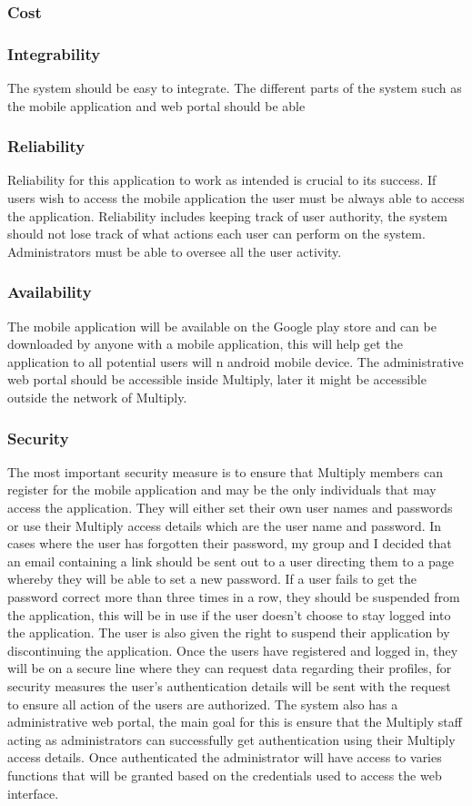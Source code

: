 \documentclass[11pt]{article}
\begin{document}
\subsubsection{Cost}

\subsubsection{Integrability}
The system should be easy to integrate. The different parts of the system such as the mobile application and web portal should be able   
\subsubsection{Reliability}
Reliability for this application to work as intended is crucial to its success. If users wish to access the mobile application the user must be always able to access the application. Reliability includes keeping track of user authority, the system should not lose track of what actions each user can perform on the system. Administrators must be able to oversee all the user activity.
\subsubsection{Availability}
The mobile application will be available on the Google play store and can be downloaded by anyone with a mobile application, this will help get the application to all potential users will n android mobile device. The administrative web portal should be accessible inside Multiply, later it might be accessible outside the network of Multiply.
\subsubsection{Security}
The most important security measure is to ensure that Multiply members can register for the mobile application and may be the only individuals that may access the application. They will either set their own user names and passwords or use their Multiply access details which are the user name and password.
In cases where the user has forgotten their password, my group and I decided that an email containing a link should be sent out to a user directing them to a page whereby they will be able to set a new password. If a user fails to get the password correct more than three times in a row, they should be suspended from the application, this will be in use if the user doesn't choose to stay logged into the application. The user is also given the right to suspend their application by discontinuing the application. Once the users have registered and logged in, they will be on a secure line where they can request data regarding their profiles, for security measures the user's authentication details will be sent with the request to ensure all action of the users are authorized. The system also has a administrative web portal, the main goal for this is ensure that the Multiply staff acting as administrators can successfully get authentication using their Multiply access details. Once authenticated the administrator will have access to varies functions that will be granted based on the credentials used to access the web interface.  
\end{document}
